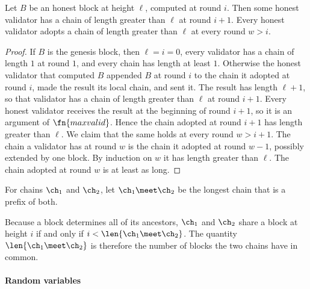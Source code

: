 \begin{lemma}\label{lem.fork}
    Let $B$ be an honest block at height $\ell$, computed at round $i$. Then
    some honest validator has a chain of length greater than $\ell$ at round
    $i+1$. Every honest validator adopts a chain of length greater than $\ell$
    at every round $w>i$.
\end{lemma}
\begin{proof}
    If $B$ is the genesis block, then $\ell=i=0$, every validator has a chain of
    length $1$ at round $1$, and every chain has length at least $1$. Otherwise
    the honest validator that computed $B$ appended $B$ at round $i$ to the
    chain it adopted at round $i$, made the result its local chain, and sent it.
    The result has length $\ell+1$, so that validator has a chain of length
    greater than $\ell$ at round $i+1$. Every honest validator receives the
    result at the beginning of round $i+1$, so it is an argument of
    $\fn{maxvalid}$. Hence the chain adopted at round $i+1$ has length greater
    than $\ell$. We claim that the same holds at every round $w>i+1$. The chain a validator has at round $w$ is the chain it adopted at round
    $w-1$, possibly extended by one block. By induction on $w$ it has length
    greater than $\ell$. The chain adopted at round $w$ is at least as long.
\end{proof}

\begin{definition}\label{def.meet}
    For chains $\ch_1$ and $\ch_2$, let $\ch_1\meet\ch_2$ be the longest chain
    that is a prefix of both.
\end{definition}

Because a block determines all of its ancestors, $\ch_1$ and $\ch_2$ share a
block at height $i$ if and only if $i<\len{\ch_1\meet\ch_2}$. The quantity
$\len{\ch_1\meet\ch_2}$ is therefore the number of blocks the two chains have in
common.

\paragraph{Random variables}


